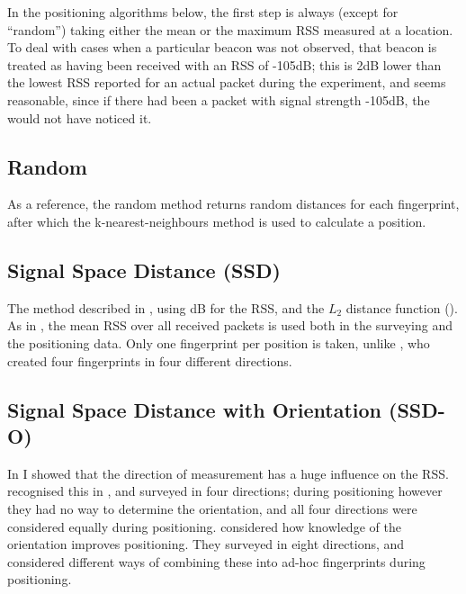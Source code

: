 In the positioning algorithms below, the first step is always (except for ``random'') taking either the mean or the maximum RSS measured at a location.
To deal with cases when a particular beacon was not observed, that beacon is treated as having been received with an RSS of -105dB; this is 2dB lower than the lowest RSS reported for an actual packet during the experiment, and seems reasonable, since if there had been a packet with signal strength -105dB, the \device would not have noticed it.

\subsection{Random}
As a reference, the random method returns random distances for each fingerprint, after which the k-nearest-neighbours method is used to calculate a position.

\subsection{Signal Space Distance (SSD)}
The method described in \citet{bahl2000radar}, using dB for the RSS, and the $L_2$ distance function ().
As in \citet{bahl2000radar}, the mean RSS over all received packets is used both in the surveying and the positioning data.
Only one fingerprint per position is taken, unlike \citet{bahl2000radar}, who created four fingerprints in four different directions.

\subsection{Signal Space Distance with Orientation (SSD-O)}
\label{sec:architecture-ssd-o}
In  I showed that the direction of measurement has a huge influence on the RSS.
\citet{bahl2000radar} recognised this in \wifi, and surveyed in four directions; during positioning however they had no way to determine the orientation, and all four directions were considered equally during positioning.
\citet{king2006compass} considered how knowledge of the orientation improves positioning.
They surveyed in eight directions, and considered different ways of combining these into ad-hoc fingerprints during positioning.

